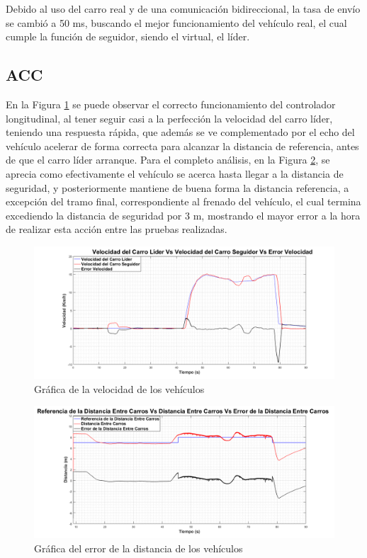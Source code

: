 \par Debido al uso del carro real y de una comunicación bidireccional, la tasa de envío se cambió a 50 ms, buscando el mejor funcionamiento del vehículo real, el cual cumple la función de seguidor, siendo el virtual, el líder.

\subsection{ACC}
En la Figura \ref{fig:velacccs} se puede observar el correcto funcionamiento del controlador longitudinal, al tener seguir casi a la perfección la velocidad del carro líder, teniendo una respuesta rápida, que además se ve complementado por el echo del vehículo acelerar de forma correcta para alcanzar la distancia de referencia, antes de que el carro líder arranque. Para el completo análisis, en la Figura \ref{fig:distacccs}, se aprecia como efectivamente el vehículo se acerca hasta llegar a la distancia de seguridad, y posteriormente mantiene de buena forma la distancia referencia, a excepción del tramo final, correspondiente al frenado del vehículo, el cual termina excediendo la distancia de seguridad por 3 m, mostrando el mayor error a la hora de realizar esta acción entre las pruebas realizadas.\\
\begin{figure}[H]
	\centering
		\includegraphics[scale=0.35]{Imagenes/velacccs}
		\caption{Gráfica de la velocidad de los vehículos}
		\label{fig:velacccs}
\end{figure}	

\begin{figure}[H]
	\centering
		\includegraphics[scale=0.35]{Imagenes/distacccs}
		\caption{Gráfica del error de la distancia de los vehículos}
		\label{fig:distacccs}
\end{figure}	



